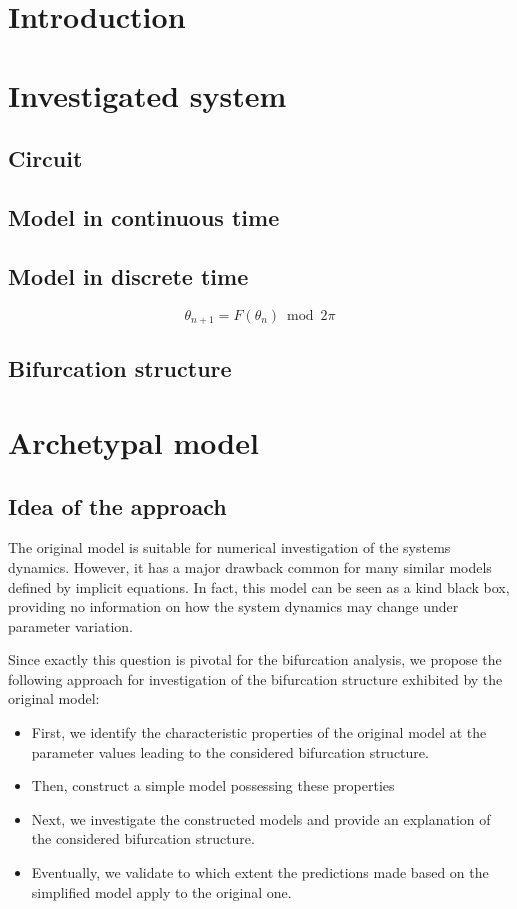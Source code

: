 \documentclass[10pt]{article}
\begin{document}
\tableofcontents

\clearpage

\section{Introduction}
\section{Investigated system}
\subsection{Circuit}
\subsection{Model in continuous time}
\subsection{Model in discrete time}
\begin{equation}
	\label{eq:map:orig}
	\theta_{n+1} = F (\theta_n) \bmod 2\pi
\end{equation}
\subsection{Bifurcation structure}

\clearpage
\section{Archetypal model}
\subsection{Idea of the approach}


The original model is suitable for numerical investigation of the
systems dynamics. However, it has a major drawback common for
many similar models defined by implicit equations. In fact,
this model can be seen as a kind black box, providing no information
on how the system dynamics may change under parameter variation.

Since exactly this question is pivotal for the bifurcation
analysis, we propose the following approach for investigation of the
bifurcation structure exhibited by the original model:
\begin{itemize}
	\item
	      First, we identify the characteristic properties of the
	      original model at the parameter values leading to the
	      considered bifurcation structure.
	\item
	      Then, construct a simple model possessing these properties
	\item
	      Next, we investigate the constructed models and provide an
	      explanation of the considered bifurcation structure.
	\item
	      Eventually, we validate to which extent the predictions made
	      based on the simplified model apply to the original one.
\end{itemize}
\end{document}
